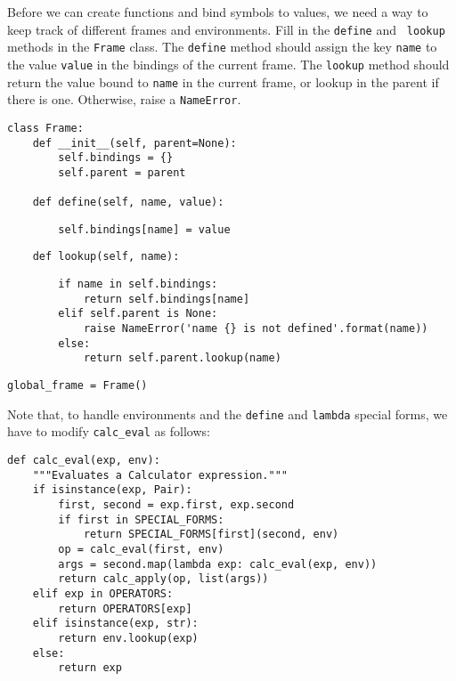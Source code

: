 \question
Before we can create functions and bind symbols to values, we need a way to keep
track of different frames and environments. Fill in the {\tt define} and {\tt
lookup} methods in the {\tt Frame} class. The {\tt define} method should assign
the key {\tt name} to the value {\tt value} in the bindings of the current
frame. The {\tt lookup} method should return the value bound to {\tt name} in
the current frame, or lookup in the parent if there is one. Otherwise, raise a
{\tt NameError}.\\

\begin{lstlisting}
class Frame:
    def __init__(self, parent=None):
        self.bindings = {}
        self.parent = parent

    def define(self, name, value):
\end{lstlisting}
\begin{solution}[0.5in]
\begin{lstlisting}
        self.bindings[name] = value
\end{lstlisting}
\end{solution}
\begin{lstlisting}
    def lookup(self, name): 
\end{lstlisting}
\begin{solution}[1.5in]
\begin{lstlisting}
        if name in self.bindings:
            return self.bindings[name]
        elif self.parent is None:
            raise NameError('name {} is not defined'.format(name))
        else:
            return self.parent.lookup(name)
\end{lstlisting}
\end{solution}
\begin{lstlisting}
global_frame = Frame()
\end{lstlisting}

\clearpage

Note that, to handle environments and the {\tt define} and {\tt lambda} special
forms, we have to modify {\tt calc\_eval} as follows:\\

\begin{lstlisting}
def calc_eval(exp, env):
    """Evaluates a Calculator expression."""
    if isinstance(exp, Pair):
        first, second = exp.first, exp.second
        if first in SPECIAL_FORMS:
            return SPECIAL_FORMS[first](second, env)
        op = calc_eval(first, env)
        args = second.map(lambda exp: calc_eval(exp, env))
        return calc_apply(op, list(args))
    elif exp in OPERATORS:
        return OPERATORS[exp]
    elif isinstance(exp, str):
        return env.lookup(exp)
    else:
        return exp
\end{lstlisting}

